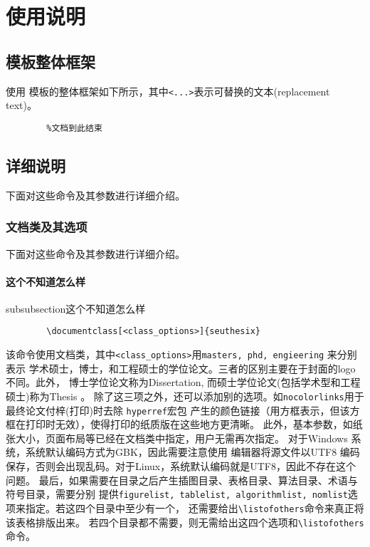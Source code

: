 \documentclass[figurelist,tablelist,algorithmlist,nomlist,masters]{seuthesix}
\begin{document}
	
	
	\chapter{使用说明}
	
	\section{模板整体框架}
	使用 \seuthesix 模板的整体框架如下所示，其中\verb+<...>+表示可替换的文本(replacement text)。
	{\color{magenta}
		\begin{verbatim}
		%文档到此结束
		\end{verbatim}
	}
	
	\section{详细说明}
	下面对这些命令及其参数进行详细介绍。
	\subsection{文档类及其选项}
	下面对这些命令及其参数进行详细介绍。
	\subsubsection{这个不知道怎么样}
	subsubsection{这个不知道怎么样}
	
	{\color{magenta}
		\begin{verbatim}
		\documentclass[<class_options>]{seuthesix}
		\end{verbatim}
	}
	该命令使用\seuthesix 文档类，其中\verb+<class_options>+用\texttt{masters, phd, engieering} 来分别表示
	学术硕士，博士，和工程硕士的学位论文。三者的区别主要在于封面的logo 不同。此外，
	博士学位论文称为Dissertation, 而硕士学位论文(包括学术型和工程硕士)称为Thesis 。
	除了这三项之外，还可以添加别的选项。如{\texttt{nocolorlinks}}用于最终论文付梓(打印)时去除
	\texttt{hyperref}宏包
	产生的颜色链接（用方框表示，但该方框在打印时无效），使得打印的纸质版在这些地方更清晰。
	此外，基本参数，如纸张大小，页面布局等已经在文档类中指定，用户无需再次指定。
	对于Windows 系统，系统默认编码方式为GBK，因此需要注意使用
	编辑器将源文件以UTF8 编码保存，否则会出现乱码。对于Linux，系统默认编码就是UTF8，因此不存在这个问题。
	最后，如果需要在目录之后产生插图目录、表格目录、算法目录、术语与符号目录，需要分别
	提供\texttt{figurelist, tablelist, algorithmlist, nomlist}选项来指定。若这四个目录中至少有一个，
	还需要给出\verb+\listofothers+命令来真正将该表格排版出来。
	若四个目录都不需要，则无需给出这四个选项和\verb+\listofothers+命令。
\end{document}
